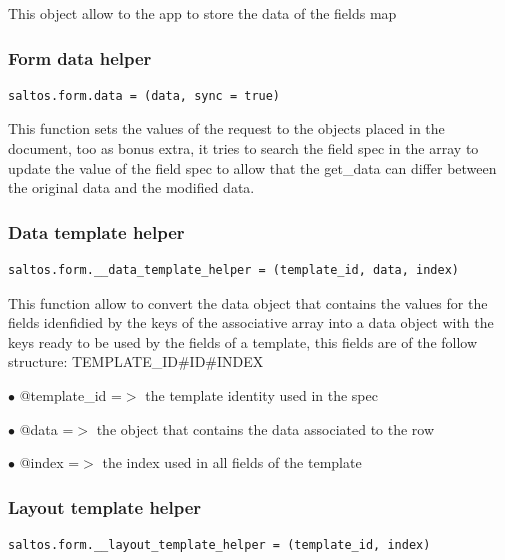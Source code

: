 \documentclass[a4paper]{article}
\begin{document}
This object allow to the app to store the data of the fields map

\hypertarget{toc218}{}
\subsubsection{Form data helper}

\begin{lstlisting}
saltos.form.data = (data, sync = true)
\end{lstlisting}

This function sets the values of the request to the objects placed in the document, too as bonus
extra, it tries to search the field spec in the array to update the value of the field spec to
allow that the get\_data can differ between the original data and the modified data.

\hypertarget{toc219}{}
\subsubsection{Data template helper}

\begin{lstlisting}
saltos.form.__data_template_helper = (template_id, data, index)
\end{lstlisting}

This function allow to convert the data object that contains the values for the fields idenfidied
by the keys of the associative array into a data object with the keys ready to be used by the
fields of a template, this fields are of the follow structure: TEMPLATE\_ID\#ID\#INDEX

\begin{compactitem}
\item[\color{myblue}$\bullet$] @template\_id =$>$ the template identity used in the spec
\item[\color{myblue}$\bullet$] @data        =$>$ the object that contains the data associated to the row
\item[\color{myblue}$\bullet$] @index       =$>$ the index used in all fields of the template
\end{compactitem}

\hypertarget{toc220}{}
\subsubsection{Layout template helper}

\begin{lstlisting}
saltos.form.__layout_template_helper = (template_id, index)
\end{lstlisting}
\end{document}
